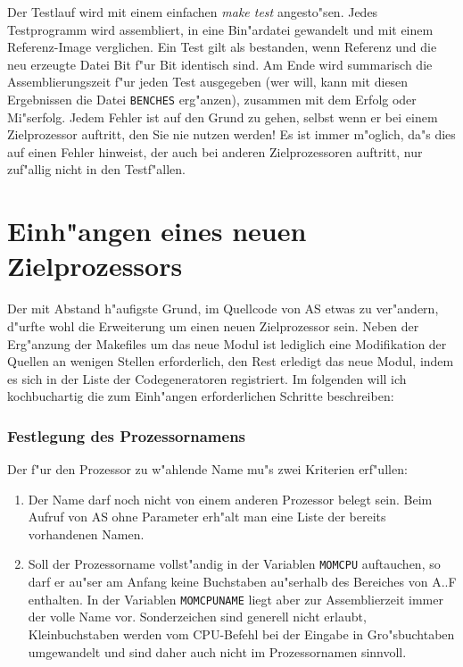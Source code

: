 \documentclass[12pt,a4paper,twoside]{report}
\newcommand{\tty}[1]{{\tt #1}}
\begin{document}
{Der Testlauf wird mit einem einfachen {\em make test} angesto"sen.  Jedes
Testprogramm wird assembliert, in eine Bin"ardatei gewandelt und mit einem
Referenz-Image verglichen.  Ein Test gilt als bestanden, wenn Referenz und
die neu erzeugte Datei Bit f"ur Bit identisch sind.  Am Ende wird
summarisch die Assemblierungszeit f"ur jeden Test ausgegeben (wer will,
kann mit diesen Ergebnissen die Datei {\tt BENCHES} erg"anzen), zusammen
mit dem Erfolg oder Mi"serfolg.  Jedem Fehler ist auf den Grund zu gehen,
selbst wenn er bei einem Zielprozessor auftritt, den Sie nie nutzen
werden!  Es ist immer m"oglich, da"s dies auf einen Fehler hinweist, der
auch bei anderen Zielprozessoren auftritt, nur zuf"allig nicht in den
Testf"allen.


\section{Einh"angen eines neuen Zielprozessors}

Der mit Abstand h"aufigste Grund, im Quellcode von AS etwas zu ver"andern,
d"urfte wohl die Erweiterung um einen neuen Zielprozessor sein.  Neben der
Erg"anzung der Makefiles um das neue Modul ist lediglich eine Modifikation
der Quellen an wenigen Stellen erforderlich, den Rest erledigt das neue
Modul, indem es sich in der Liste der Codegeneratoren registriert.  Im
folgenden will ich kochbuchartig die zum Einh"angen erforderlichen
Schritte beschreiben:

\subsubsection{Festlegung des Prozessornamens}

Der f"ur den Prozessor zu w"ahlende Name mu"s zwei Kriterien erf"ullen:
\begin{enumerate}
\item{Der Name darf noch nicht von einem anderen Prozessor belegt sein.   
      Beim Aufruf von AS ohne Parameter erh"alt man eine Liste der bereits
      vorhandenen Namen.}
\item{Soll der Prozessorname vollst"andig in der Variablen \tty{MOMCPU}  
      auftauchen, so darf er au"ser am Anfang keine Buchstaben au"serhalb 
      des Bereiches von A..F enthalten.  In der Variablen \tty{MOMCPUNAME}
      liegt aber zur Assemblierzeit immer der volle Name vor.   
      Sonderzeichen sind generell nicht erlaubt, Kleinbuchstaben
      werden vom CPU-Befehl bei der Eingabe in Gro"sbuchtaben umgewandelt
      und sind daher auch nicht im Prozessornamen sinnvoll.}
\end{enumerate}

}
\end{document}
